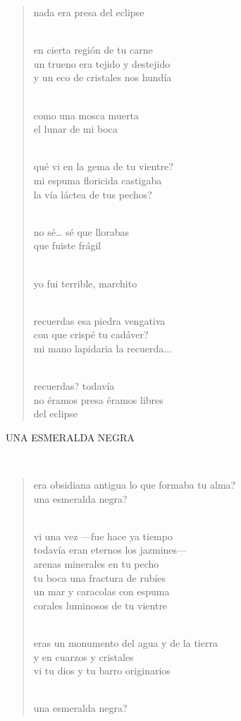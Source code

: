 \documentclass[a4paper, 12pt]{article}
\begin{document}
\begin{verse}
nada era presa del eclipse\\
~ 

en cierta región de tu carne\\
un trueno era tejido y destejido\\
y un eco de cristales nos hundía\\
~ 

como una mosca muerta\\
el lunar de mi boca\\
~ 

qué vi en la gema de tu vientre?\\
mi espuma floricida castigaba\\
la vía láctea de tus pechos?\\
~ 

no sé… sé que llorabas\\
que fuiste frágil\\
~ 

yo fui terrible, marchito\\
~ 

recuerdas esa piedra vengativa\\
con que crispé tu cadáver?\\
mi mano lapidaria la recuerda...\\
~ 

recuerdas? todavía\\
no éramos presa éramos libres\\
del eclipse\\

\end{verse}

\pagebreak 
\centerline{UNA ESMERALDA NEGRA}
~

\begin{verse}
    
era obsidiana antigua lo que formaba tu alma?\\
una esmeralda negra?\\
~ 

vi una vez —fue hace ya tiempo\\
todavía eran eternos los jazmines—\\
arenas minerales en tu pecho\\
tu boca una fractura de rubíes\\
un mar y caracolas con espuma\\
corales luminosos de tu vientre\\
~ 

eras un monumento del agua y de la tierra\\
y en cuarzos y cristales\\
vi tu dios y tu barro originarios\\
~ 

una esmeralda negra?\\
\end{verse}
\end{document}
